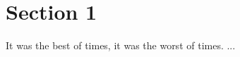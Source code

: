 \documentclass[../multiple_files.tex]{subfiles}
\begin{document}
\section{Section 1}

It was the best of times, it was the worst of times.
...
\end{document}
